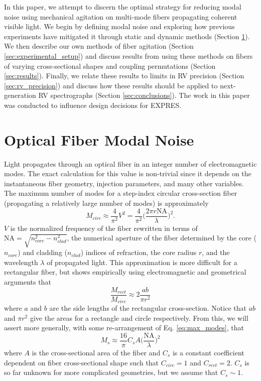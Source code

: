 \documentclass[twocolumn]{emulateapj}
\begin{document}
In this paper, we attempt to discern the optimal strategy for reducing modal noise using mechanical agitation on multi-mode fibers propagating coherent visible light. We begin by defining modal noise and exploring how previous experiments have mitigated it through static and dynamic methods (Section \ref{sec:modal_noise_intro}). We then describe our own methods of fiber agitation (Section \ref{sec:experimental_setup}) and discuss results from using these methods on fibers of varying cross-sectional shapes and coupling permutations (Section \ref{sec:results}). Finally, we relate these results to limits in RV precision (Section \ref{sec:rv_precision}) and discuss how these results should be applied to next-generation RV spectrographs (Section \ref{sec:conclusions}). The work in this paper was conducted to influence design decisions for EXPRES.

\section{Optical Fiber Modal Noise}
\label{sec:modal_noise_intro}

Light propagates through an optical fiber in an integer number of electromagnetic modes. The exact calculation for this value is non-trivial since it depends on the instantaneous fiber geometry, injection parameters, and many other variables. The maximum number of modes for a step-index circular cross-section fiber (propagating a relatively large number of modes) is approximately
\begin{equation}
M_{circ} \approx \frac{4}{\pi ^2} V^2 = \frac{4}{\pi ^2} \Bigg( \frac{2 \pi r \mathrm{NA}}{\lambda} \Bigg) ^2.
\label{eq:max_modes}
\end{equation}
$V$ is the normalized frequency of the fiber rewritten in terms of $\mathrm{NA} = \sqrt{n_{core}^2 - n_{clad}^2}$, the numerical aperture of the fiber determined by the core ($n_{core}$) and cladding ($n_{clad}$) indices of refraction, the core radius $r$, and the wavelength $\lambda$ of propagated light. This approximation is more difficult for a rectangular fiber, but \citet{Nikitin2011} shows empirically using electromagnetic and geometrical arguments that
\begin{equation}
\frac{M_{rect}}{M_{circ}} \approx 2 \frac{ab}{\pi r^2}
\label{eq:prop_modes}
\end{equation}
where $a$ and $b$ are the side lengths of the rectangular cross-section. Notice that $ab$ and $\pi r^2$ give the areas for a rectangle and circle respectively. From this, we will assert more generally, with some re-arrangement of Eq. \ref{eq:max_modes}, that
\begin{equation}
M_{s} \approx \frac{16}{\pi} C_{s} A \Bigg( \frac{\mathrm{NA}}{\lambda} \Bigg) ^2
\label{eq:mode_area}
\end{equation}
where $A$ is the cross-sectional area of the fiber and $C_{s}$ is a constant coefficient dependent on fiber cross-sectional shape such that $C_{circ} = 1$ and $C_{rect} = 2$. $C_{s}$ is so far unknown for more complicated geometries, but we assume that $C_{s} \sim 1$.
\end{document}
